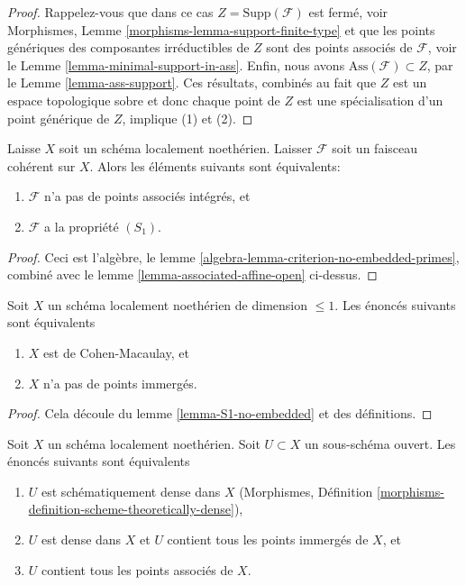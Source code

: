 \begin{proof}
Rappelez-vous que dans ce cas $Z = \text{Supp}(\mathcal{F})$ est fermé, voir Morphismes,
Lemme \ref{morphisms-lemma-support-finite-type}  et que les points génériques des composantes irréductibles de
 $Z$ sont des points associés de $\mathcal{F}$, voir le Lemme  \ref{lemma-minimal-support-in-ass}.
Enfin, nous avons  $\text{Ass}(\mathcal{F}) \subset Z$, par le Lemme  \ref{lemma-ass-support}. Ces résultats, combinés au
fait que  $Z$ est un espace topologique sobre et donc chaque point
de $Z$ est une spécialisation d'un point générique de $Z$, implique
(1) et (2).
\end{proof}

\begin{lemma}
\label{lemma-S1-no-embedded}
Laisse $X$ soit un schéma localement noethérien. Laisser $\mathcal{F}$ soit un
faisceau cohérent sur $X$. Alors les éléments suivants sont équivalents:
\begin{enumerate}
\item $\mathcal{F}$  n’a pas de points associés intégrés, et
\item $\mathcal{F}$  a la propriété  $(S_1)$.
\end{enumerate}
\end{lemma}

\begin{proof}
Ceci est l'algèbre, le lemme  \ref{algebra-lemma-criterion-no-embedded-primes}, combiné avec le lemme  \ref{lemma-associated-affine-open} 
ci-dessus.
\end{proof}

\begin{lemma}
\label{lemma-noetherian-dim-1-CM-no-embedded-points}
Soit  $X$  un schéma localement noethérien de dimension  $\leq 1$. Les
énoncés suivants sont équivalents
\begin{enumerate}
\item $X$  est de Cohen-Macaulay, et
\item $X$  n'a pas de points immergés.
\end{enumerate}
\end{lemma}

\begin{proof}
Cela découle du lemme  \ref{lemma-S1-no-embedded}  et des définitions.
\end{proof}

\begin{lemma}
\label{lemma-scheme-theoretically-dense-contain-embedded-points}
Soit  $X$  un schéma localement noethérien. Soit  $U \subset X$  un
sous-schéma ouvert. Les énoncés suivants sont équivalents
\begin{enumerate}
\item $U$  est schématiquement dense dans  $X$  (Morphismes, Définition
 \ref{morphisms-definition-scheme-theoretically-dense}),
\item $U$  est dense dans  $X$  et  $U$  contient tous les points
immergés de  $X$, et
\item $U$  contient tous les points associés de  $X$.
\end{enumerate}
\end{lemma}


